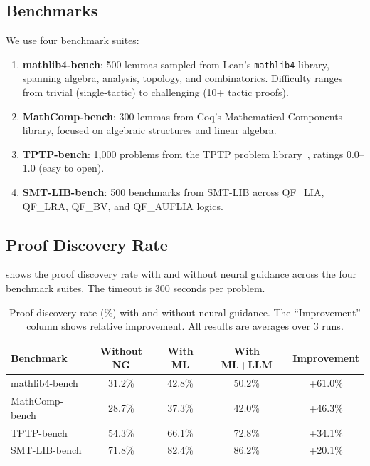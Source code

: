 \documentclass[11pt,a4paper]{article}
\begin{document}
\subsection{Benchmarks}

We use four benchmark suites:

\begin{enumerate}
  \item \textbf{mathlib4-bench}: 500 lemmas sampled from Lean's
  \texttt{mathlib4} library, spanning algebra, analysis, topology, and
  combinatorics. Difficulty ranges from trivial (single-tactic) to
  challenging (10+ tactic proofs).

  \item \textbf{MathComp-bench}: 300 lemmas from Coq's Mathematical Components
  library, focused on algebraic structures and linear algebra.

  \item \textbf{TPTP-bench}: 1,000 problems from the TPTP problem
  library~\citep{tptp}, ratings 0.0--1.0 (easy to open).

  \item \textbf{SMT-LIB-bench}: 500 benchmarks from SMT-LIB across
  QF\_LIA, QF\_LRA, QF\_BV, and QF\_AUFLIA logics.
\end{enumerate}

\subsection{Proof Discovery Rate}

 shows the proof discovery rate with and without neural
guidance across the four benchmark suites. The timeout is 300 seconds per
problem.

\begin{table}[htbp]
\centering
\caption{Proof discovery rate (\%) with and without neural guidance. The
``Improvement'' column shows relative improvement. All results are averages
over 3 runs.}
\label{tab:discovery}
\begin{tabular}{@{}lcccc@{}}
\toprule
\textbf{Benchmark} & \textbf{Without NG} & \textbf{With ML} & \textbf{With ML+LLM} & \textbf{Improvement} \\
\midrule
mathlib4-bench   & 31.2\% & 42.8\% & 50.2\% & +61.0\% \\
MathComp-bench   & 28.7\% & 37.3\% & 42.0\% & +46.3\% \\
TPTP-bench       & 54.3\% & 66.1\% & 72.8\% & +34.1\% \\
SMT-LIB-bench    & 71.8\% & 82.4\% & 86.2\% & +20.1\% \\
\bottomrule
\end{tabular}
\end{table}
\end{document}
